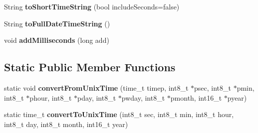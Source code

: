 \begin{DoxyCompactItemize}
\item 
\hypertarget{class_date_time_ae96f4c5682e7df9a3af768e42d6d3b86}{}String {\bfseries to\+Short\+Time\+String} (bool include\+Seconds=false)\label{class_date_time_ae96f4c5682e7df9a3af768e42d6d3b86}

\item 
\hypertarget{class_date_time_a21f09ede608e518181983b00fa9ed3e9}{}String {\bfseries to\+Full\+Date\+Time\+String} ()\label{class_date_time_a21f09ede608e518181983b00fa9ed3e9}

\item 
\hypertarget{class_date_time_a60d049362b1d16cbe9ceae334ecd56d5}{}void {\bfseries add\+Milliseconds} (long add)\label{class_date_time_a60d049362b1d16cbe9ceae334ecd56d5}

\end{DoxyCompactItemize}
\subsection*{Static Public Member Functions}
\begin{DoxyCompactItemize}
\item 
\hypertarget{class_date_time_a0df39a04d71191364a79249256232539}{}static void {\bfseries convert\+From\+Unix\+Time} (time\+\_\+t timep, int8\+\_\+t $\ast$psec, int8\+\_\+t $\ast$pmin, int8\+\_\+t $\ast$phour, int8\+\_\+t $\ast$pday, int8\+\_\+t $\ast$pwday, int8\+\_\+t $\ast$pmonth, int16\+\_\+t $\ast$pyear)\label{class_date_time_a0df39a04d71191364a79249256232539}

\item 
\hypertarget{class_date_time_acd3d57fa4df25cd12e0f11322a08f8e6}{}static time\+\_\+t {\bfseries convert\+To\+Unix\+Time} (int8\+\_\+t sec, int8\+\_\+t min, int8\+\_\+t hour, int8\+\_\+t day, int8\+\_\+t month, int16\+\_\+t year)\label{class_date_time_acd3d57fa4df25cd12e0f11322a08f8e6}

\end{DoxyCompactItemize}
